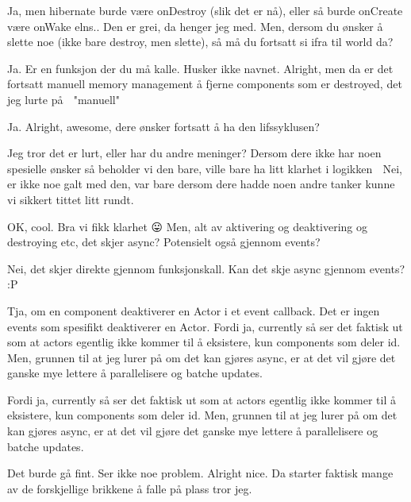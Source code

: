 Ja, men hibernate burde være onDestroy (slik det er nå), eller så burde onCreate være onWake elns..
Den er grei, da henger jeg med.
Men, dersom du ønsker å slette noe (ikke bare destroy, men slette), så må du fortsatt si ifra til world da?

Ja.
Er en funksjon der du må kalle. Husker ikke navnet.
Alright, men da er det fortsatt manuell memory management å fjerne components som er destroyed, det jeg lurte på 🙂
"manuell"

Ja.
Alright, awesome, dere ønsker fortsatt å ha den lifssyklusen?

Jeg tror det er lurt, eller har du andre meninger?
Dersom dere ikke har noen spesielle ønsker så beholder vi den bare, ville bare ha litt klarhet i logikken 🙂
Nei, er ikke noe galt med den, var bare dersom dere hadde noen andre tanker kunne vi sikkert tittet litt rundt.

OK, cool.
Bra vi fikk klarhet 😛
Men, alt av aktivering og deaktivering og destroying etc, det skjer async? Potensielt også gjennom events?

Nei, det skjer direkte gjennom funksjonskall.
Kan det skje async gjennom events?
:P

Tja, om en component deaktiverer en Actor i et event callback. Det er ingen events som spesifikt deaktiverer en Actor.
Fordi ja, currently så ser det faktisk ut som at actors egentlig ikke kommer til å eksistere, kun components som deler id.
Men, grunnen til at jeg lurer på om det kan gjøres async, er at det vil gjøre det ganske mye lettere å parallelisere og batche updates.

Fordi ja, currently så ser det faktisk ut som at actors egentlig ikke kommer til å eksistere, kun components som deler id.
Men, grunnen til at jeg lurer på om det kan gjøres async, er at det vil gjøre det ganske mye lettere å parallelisere og batche updates.

Det burde gå fint. Ser ikke noe problem.
Alright nice. Da starter faktisk mange av de forskjellige brikkene å falle på plass tror jeg.
